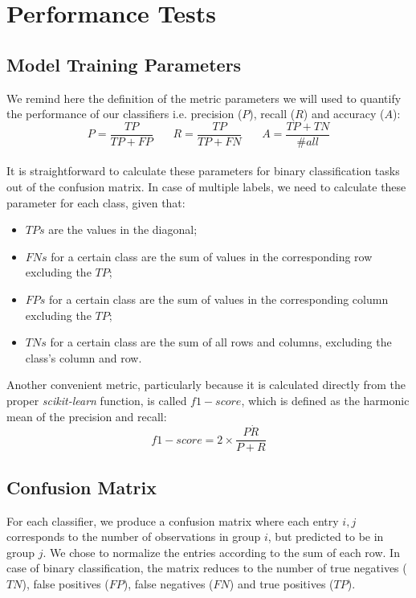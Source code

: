 \documentclass{article}
\begin{document}
\section{Performance Tests}
\subsection{Model Training Parameters}
We remind here the definition of the metric parameters we will used to quantify the performance of our classifiers i.e. precision ($P$), recall ($R$) and accuracy ($A$):
\\

\begin{equation}
P = \frac{TP}{TP + FP} \ \ \ \ \ \ \ \  R = \frac{TP}{TP + FN} \ \ \ \ \ \ \ \  A = \frac{TP + TN}{\#all}
\end{equation}
\\

It is straightforward to calculate these parameters for binary classification tasks out of the confusion matrix. In case of multiple labels, we need to calculate these parameter for each class, given that:
\begin{itemize}
	\item  $TPs$ are the values in the diagonal; \
	\item  $FNs$ for a certain class are the sum of values in the corresponding row excluding the $TP$; \
	\item  $FPs$ for a certain class are the sum of values in the corresponding column excluding the $TP$; \
	\item  $TNs$ for a certain class are the sum of all rows and columns, excluding the class's column and row. \
\end{itemize}


Another convenient metric, particularly because it is calculated directly from the proper \textit{scikit-learn} function, is called $f1-score$, which is defined as the harmonic mean of the precision and recall:
\begin{equation}
f1-score = 2 \times \frac{P \dot R }{P + R }
\end{equation}


\subsection{Confusion Matrix}
For each classifier, we produce a confusion matrix where each entry $i,j$ corresponds to the number of observations in group $i$, but predicted to be in group $j$. We chose to normalize the entries according to the sum of each row.
In case of binary classification, the matrix reduces to the number of true negatives ($TN$), false positives ($FP$), false negatives ($FN$) and true positives ($TP$).
\end{document}
